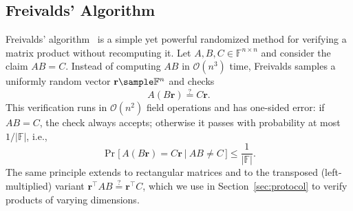 \subsection{Freivalds' Algorithm}
Freivalds' algorithm~\cite{Freivalds,Korec} is a simple yet powerful randomized method for verifying a matrix product without recomputing it.
Let \(A,B,C\in \mathbb{F}^{n\times n}\) and consider the claim \(AB=C\).
Instead of computing \(AB\) in \(\mathcal{O}(n^3)\) time, Freivalds samples a uniformly random vector \(\mathbf{r}\sample \mathbb{F}^n\) and checks
\[
A(B\mathbf{r}) \stackrel{?}{=} C\mathbf{r}.
\]
This verification runs in $\mathcal{O}(n^2)$ field operations and has one-sided error: if $AB=C$, the check always accepts; otherwise it passes with probability at most $1/|\mathbb{F}|$, i.e.,
\[
\Pr\!\big[\,A(B\mathbf{r}) = C\mathbf{r}\ \big|\ AB\neq C\,\big] \le \frac{1}{|\mathbb{F}|}.
\]
The same principle extends to rectangular matrices and to the transposed (left-multiplied) variant $\mathbf{r}^{\top}\!AB \stackrel{?}{=} \mathbf{r}^{\top}\!C$, which we use in Section~\ref{sec:protocol} to verify products of varying dimensions.

